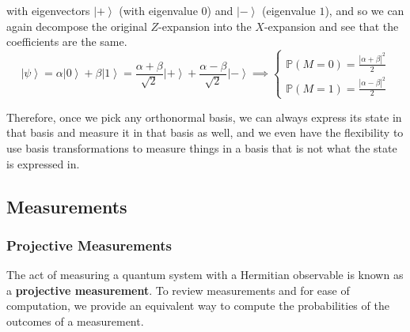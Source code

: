 \documentclass{article}
\newcommand{\ket}[1]{\ensuremath{\left|#1\right\rangle}}
\begin{document}
\begin{example}
\begin{equation}
      \end{equation}
      with eigenvectors $\ket{+}$ (with eigenvalue $0$) and $\ket{-}$ (eigenvalue $1$), and so we can again decompose the original $Z$-expansion into the $X$-expansion and see that the coefficients are the same. 
      \begin{equation} 
        \ket{\psi} = \alpha \ket{0} + \beta \ket{1} = \frac{\alpha + \beta}{\sqrt{2}} \ket{+} + \frac{\alpha - \beta}{\sqrt{2}} \ket{-} \implies \begin{cases} \mathbb{P}(M = 0) = \frac{|\alpha + \beta|^2}{2} \\ \mathbb{P}(M = 1) = \frac{|\alpha - \beta|^2}{2} \end{cases}
      \end{equation} 
    \end{example}

    Therefore, once we pick any orthonormal basis, we can always express its state in that basis and measure it in that basis as well, and we even have the flexibility to use basis transformations to measure things in a basis that is not what the state is expressed in. 

  \subsection{Measurements} 

    \subsubsection{Projective Measurements}

      The act of measuring a quantum system with a Hermitian observable is known as a \textbf{projective measurement}. To review measurements and for ease of computation, we provide an equivalent way to compute the probabilities of the outcomes of a measurement. 
\end{document}
